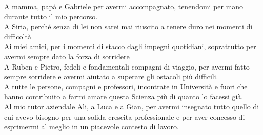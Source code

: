 \cleardoublepage
\begingroup
\let\clearpage\endgroup
\null{}

\begin{flushright}
\begin{minipage}{5.3in}
\begin{flushright}
\begin{em}
A mamma, papà e Gabriele per avermi accompagnato, tenendomi per mano durante tutto il mio percorso. 
\\[12pt]
A Siria, perché senza di lei non sarei mai riuscito a tenere duro nei momenti di difficoltà
\\[12pt]
Ai miei amici, per i momenti di stacco dagli impegni quotidiani, soprattutto per avermi sempre dato la forza di sorridere
\\[12pt]
A Ruben e Pietro, fedeli e fondamentali compagni di viaggio, per avermi fatto sempre sorridere e avermi aiutato a superare gli ostacoli più difficili.
\\[12pt]
A tutte le persone, compagni e professori, incontrate in Università e fuori che hanno contribuito a farmi amare questa Scienza più di quanto lo facessi già.
\\[12pt]
Al mio tutor aziendale Ali, a Luca e a Gian, per avermi insegnato tutto quello di cui avevo bisogno per una solida crescita professionale e per aver concesso di esprimermi al meglio in un piacevole contesto di lavoro.
\end{em}
\end{flushright}
\end{minipage}
\end{flushright}
 \null
